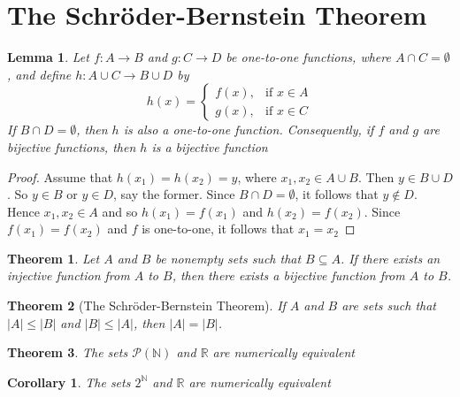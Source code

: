 \documentclass[10pt]{report}
\newtheorem{thm2}{Theorem}[section]
\newtheorem{cor2}{Corollary}[section]
\newtheorem{lem2}{Lemma}[section]
\begin{document}
\section{The Schr\"{o}der-Bernstein Theorem}
\begin{lem2}
Let $f:A\to B$ and $g:C\to D$ be one-to-one functions, where $A\cap C= \emptyset$, and define $h:A\cup C\to B\cup D$ by
$$h(x)=
\begin{cases}
f(x), & \text{if }x\in A \\
g(x), & \text{if }x\in C
\end{cases}$$
If $B\cap D=\emptyset$, then $h$ is also a one-to-one function. Consequently, if $f$ and $g$ are bijective functions, then $h$ is a bijective function
\end{lem2}
\begin{proof}
Assume that $h(x_1)=h(x_2)=y$, where $x_1, x_2\in A\cup B$. Then $y\in B\cup D$. So $y\in B$ or $y\in D$, say the former. Since $B\cap D= \emptyset$, it follows that $y\notin D$. Hence $x_1, x_2\in A$ and so $h(x_1)=f(x_1)$ and $h(x_2)=f(x_2)$. Since $f(x_1)=f(x_2)$ and $f$ is one-to-one, it follows that $x_1 = x_2$
\end{proof}
\begin{thm2}
Let $A$ and $B$ be nonempty sets such that $B\subseteq A$. If there exists an injective function from $A$ to $B$, then there exists a bijective function from $A$ to $B$.
\end{thm2}
\begin{thm2}[The Schr\"{o}der-Bernstein Theorem]
If $A$ and $B$ are sets such that $|A|\leq |B|$ and $|B|\leq |A|$, then $|A|=|B|$.
\end{thm2}
\begin{thm2}
The sets $\mathcal{P}(\mathbb{N})$ and $\mathbb{R}$ are numerically equivalent
\end{thm2}
\begin{cor2}
The sets $2^\mathbb{N}$ and $\mathbb{R}$ are numerically equivalent
\end{cor2}
\end{document}
